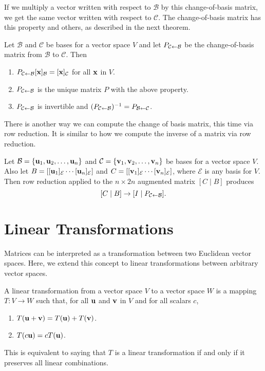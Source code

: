 \documentclass[../m073main.tex]{subfiles}
\begin{document}
If we multiply a vector written with respect to $\mathcal{B}$ by this change-of-basis matrix, we get the same vector written with respect to $\mathcal{C}$.
The change-of-basis matrix has this property and others, as described in the next theorem.

\begin{theorem}
	Let $\mathcal{B}$ and $\mathcal{C}$ be bases for a vector space $V$ and let $P_{\mathcal{C} \leftarrow \mathcal{B}}$ be the change-of-basis matrix from $\mathcal{B}$ to $\mathcal{C}$.
	Then
	\begin{enumerate}[label=(\alph*)]
		\item $P_{\mathcal{C} \leftarrow \mathcal{B}}[\mathbf{x}]_{\mathcal{B}} = [\mathbf{x}]_{\mathcal{C}}$ for all $\mathbf{x}$ in $V$.
		\item $P_{\mathcal{C} \leftarrow \mathcal{B}}$ is the unique matrix $P$ with the above property.
		\item $P_{\mathcal{C} \leftarrow \mathcal{B}}$ is invertible and $(P_{\mathcal{C} \leftarrow \mathcal{B}})^{-1} = P_{\mathcal{B} \leftarrow \mathcal{C}}$.
	\end{enumerate}
\end{theorem}

There is another way we can compute the change of basis matrix, this time via row reduction.
It is similar to how we compute the inverse of a matrix via row reduction.

\begin{theorem}
	Let $\mathcal{B} = \{\mathbf{u}_1, \mathbf{u}_2, \ldots, \mathbf{u}_n\}$ and $\mathcal{C} = \{\mathbf{v}_1, \mathbf{v}_2, \ldots, \mathbf{v}_n\}$ be bases for a vector space $V$.
	Also let $B = [[\mathbf{u}_1]_{\mathcal{E}} \cdots [\mathbf{u}_n]_{\mathcal{E}}]$ and $C = [[\mathbf{v}_1]_{\mathcal{E}} \cdots [\mathbf{v}_n]_{\mathcal{E}}]$, where $\mathcal{E}$ is any basis for $V$.
	Then row reduction applied to the $n \times 2n$ augmented matrix $[C \;|\; B]$ produces
	\[ [C \;|\; B] \to [I \;|\; P_{\mathcal{C} \leftarrow \mathcal{B}}]. \]
\end{theorem}

\section{Linear Transformations}
Matrices can be interpreted as a transformation between two Euclidean vector spaces.
Here, we extend this concept to linear transformations between arbitrary vector spaces.

\begin{definition}
	A linear transformation from a vector space $V$ to a vector space $W$ is a mapping $T : V \to W$ such that, for all $\mathbf{u}$ and $\mathbf{v}$ in $V$ and for all scalars $c$,
	\begin{enumerate}
		\item $T(\mathbf{u} + \mathbf{v}) = T(\mathbf{u}) + T(\mathbf{v})$.
		\item $T(c \mathbf{u}) = cT(\mathbf{u})$.
	\end{enumerate}
	This is equivalent to saying that $T$ is a linear transformation if and only if it preserves all linear combinations.
\end{definition}
\end{document}
